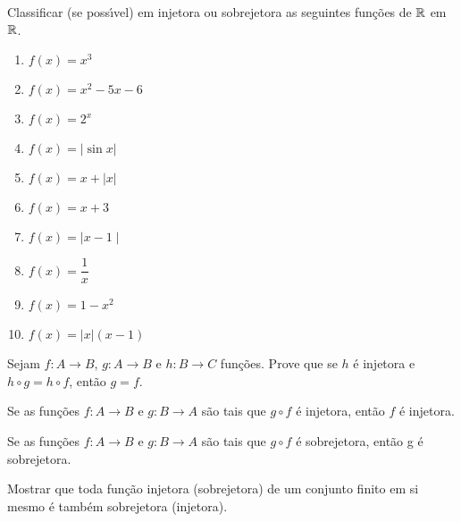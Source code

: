 \documentclass[12pt]{exam}
\begin{document}
\newpage

\questao{} Classificar (se poss{\'\i}vel) em injetora ou sobrejetora as seguintes fun{\c c}{\~o}es de $\mathbb{R}$ em $\mathbb{R}$.

\begin{multicols}{2}
    \begin{enumerate}[label={\alph*})]
        \item $f(x) = x^3$
        \item $f(x) = x^2 - 5x - 6$
        \item $f(x) = 2^x$
        \item $f(x) = | \sin x |$
        \item $f(x) = x + | x |$
        \item $f(x) = x + 3$
        \item $f(x) = \mid x - 1\mid$
        \item $f(x) = \dfrac{1}{x}$
        \item $f(x) = 1 - x^2$
        \item $f(x) = |x|(x - 1)$
    \end{enumerate}
\end{multicols}

\vspace{.3cm}

\questao{} Sejam $f : A \to B$, $g : A \to B$ e $h : B \to C$ fun\c{c}\~oes. Prove que se $h$ \'e injetora e $h \circ g = h \circ f$, ent\~ao $g = f$.

\vspace{.3cm}

\questao{} Se as fun{\c c}{\~o}es $f : A \to B$ e $g : B\to A$ s{\~a}o
tais que $g\circ f$ {\'e} injetora, ent{\~a}o $f$ {\'e} injetora.

\vspace{.3cm}

\questao{} Se as fun{\c c}{\~o}es $f : A \to B$ e $g : B\to A$ s{\~a}o
tais que $g\circ f$ {\'e} sobrejetora, ent{\~a}o g {\'e} sobrejetora.

\vspace{.3cm}

\questao{} Mostrar que toda fun{\c c}{\~a}o injetora (sobrejetora) de um conjunto finito em si mesmo {\'e} tamb{\'e}m sobrejetora (injetora).
\end{document}
